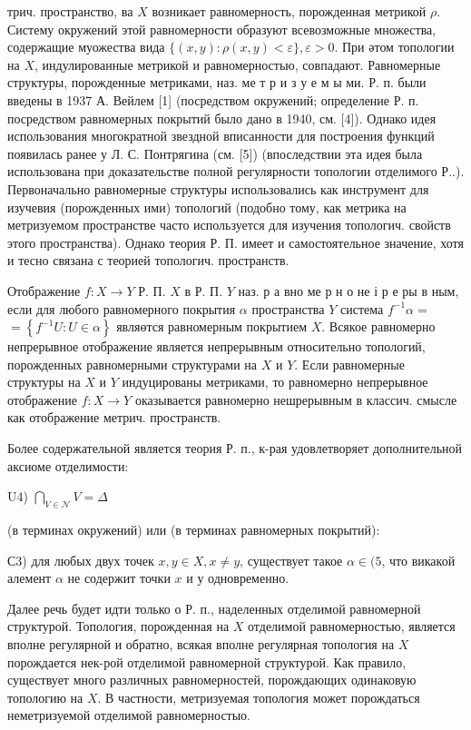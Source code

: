 \documentclass[10pt]{article}
\begin{document}
трич. пространство, ва $X$ возникает равномерность, порожденная метрикой $\rho$. Систему окружений этой равномерности образуют всевозможные множества, содержащие муожества вида $\{(x, y): \rho(x, y)<\varepsilon\}, \varepsilon>0$. При әтом топологии на $X$, индулированные метрикой и равномерностью, совпадают. Равномерные структуры, порожденные метриками, наз. ме т р и з у е м ы ми. Р. п. были введены в 1937 А. Вейлем [1] (посредством окружений; определение Р. п. посредством равномерных покрытий было дано в 1940, см. [4]). Однако идея использования многократной звездной вписанности для построения функций появилась ранее у Л. С. Понтрягина (см. [5]) (впоследствии эта идея была использована при доказательстве полной регулярности топологии отделимого Р..). Первоначально равномерные структуры использовались как инструмент для изучевия (порожденных ими) топологий (подобно тому, как метрика на метризуемом пространстве часто используется для изучения топологич. свойств этого пространства). Однако теория Р. П. имеет и самостоятельное значение, хотя и тесно связана с теорией топологич. пространств.



Отображение $f: X \rightarrow Y$ Р. П. $X$ в Р. П. $Y$ наз. р а вно ме р н о не і р е ры в ным, если для любого равномерного покрытия $\alpha$ пространства $Y$ система $f^{-1} \alpha=$ $=\left\{f^{-1} U: U \in \alpha\right\}$ являөтся равномерным покрытием $X$. Всякое равномерно непрерывное отображение является непрерывным относительно топологий, порожденных равномерными структурами на $X$ и $Y$. Если равномерные структуры на $X$ и $Y$ индуцированы метриками, то равномерно непрерывное отображение $f: X \rightarrow Y$ оказывается равномерно нешрерывным в классич. смысле как отображение метрич. пространств.



Более содержательной является теория Р. п., к-рая удовлетворяет дополнительной аксиоме отделимости:



U4) $\bigcap_{V \in \mathscr{N}} V=\Delta$



(в терминах окружений) или (в терминах равномерных покрытий):



С3) для любых двух точек $x, y \in X, x \neq y$, существует такое $\alpha \in(5$, что викакой алемент $\alpha$ не содержит точки $x$ и $у$ одновременно.



Далее речь будет идти только о Р. п., наделенных отделимой равномерной структурой. Топология, порожденная на $X$ отделимой равномерностью, является вполне регулярной и обратно, всякая вполне регулярная топология на $X$ порождается нек-рой отделимой равномерной структурой. Как правило, существует много различных равномерностей, порождающих одинаковую топологию на $X$. В частности, метризуемая топология может порождаться неметризуемой отделимой равномерностыо.
\end{document}

